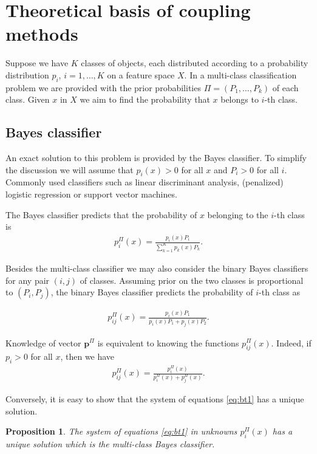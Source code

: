 \documentclass[twoside,11pt]{article}
\newtheorem{prop}{Proposition}
\begin{document}
\section{Theoretical basis of coupling methods}

Suppose we have $K$ classes of objects, each distributed according to a probability distribution $p_i$, $i=1,\ldots, K$ on a feature space $X$. In a multi-class classification problem we are provided with the prior probabilities $\Pi = (P_1, \ldots, P_k)$ of each class. Given $x$ in $X$ we aim to find the probability that $x$ belongs to $i$-th class. 


\subsection{Bayes classifier}

An exact solution to this problem is provided by the Bayes classifier. To simplify the discussion we will assume that $p_i(x) > 0$ for all $x$ and $P_i > 0$ for all $i$. Commonly used classifiers such as linear discriminant analysis, (penalized) logistic regression or support vector machines.

 The Bayes classifier predicts that the probability of $x$ belonging to the $i$-th class is
\begin{align}
 p^\Pi_i(x) = \frac{p_i(x) P_i}{\sum_{k=1}^K p_k(x)P_k}.
\end{align}

Besides the multi-class classifier we may also consider the binary Bayes classifiers for any pair $(i,j)$ of classes. Assuming prior on the two classes is proportional to $(P_i, P_j)$, the binary Bayes classifier predicts the probability of $i$-th class as 

\begin{align}
	p_{ij}^\Pi(x) = \frac{p_i(x) P_1}{p_i(x)P_1 + p_j(x)P_2}.
\end{align}

Knowledge of vector $\boldsymbol{p}^\Pi$ is  equivalent to knowing the functions $p^\Pi_{ij}(x)$. Indeed, if $p_{i}> 0$ for all $x$, then we have
\begin{align}
p_{ij}^\Pi(x) = \frac{p_i^\Pi(x)}{p_i^\Pi(x) + p_j^\Pi(x)}. \label{eq:bt1}
\end{align}

Conversely, it is easy to show that  the system of equations \eqref{eq:bt1} has a unique solution.

\begin{prop} \label{prop:binary2multi}
The system of  equations \eqref{eq:bt1} in unknowns $p_i^\Pi(x)$ has a unique solution which is the multi-class Bayes classifier.
\end{prop}
\end{document}
